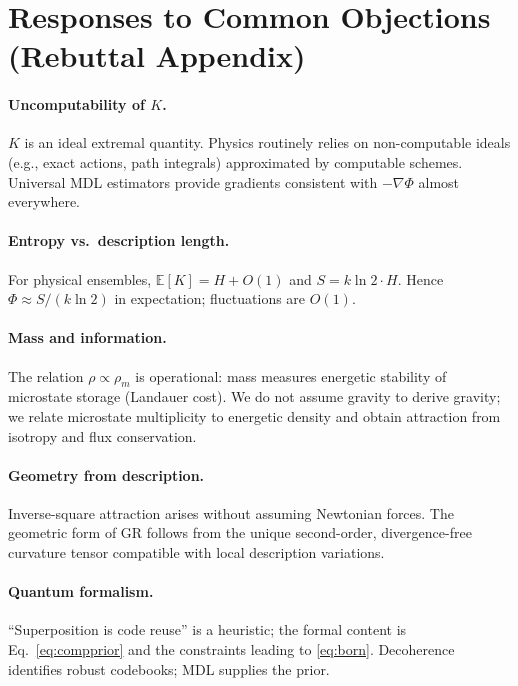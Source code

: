 \documentclass[aps,preprint,onecolumn,longbibliography,nofootinbib]{revtex4-2}
\numberwithin{equation}{section}        %
\begin{document}
\section{Responses to Common Objections (Rebuttal Appendix)}\label{app:E}
\paragraph*{Uncomputability of $K$.}
$K$ is an ideal extremal quantity. Physics routinely relies on non-computable ideals (e.g., exact actions, path integrals) approximated by computable schemes. Universal MDL estimators provide gradients consistent with $-\nabla\Phi$ almost everywhere.

\paragraph*{Entropy vs.\ description length.}
For physical ensembles, $\mathbb{E}[K]=H+O(1)$ and $S=k\ln 2\cdot H$. Hence $\Phi\approx S/(k\ln2)$ in expectation; fluctuations are $O(1)$.

\paragraph*{Mass and information.}
The relation $\rho\propto\rho_m$ is operational: mass measures energetic stability of microstate storage (Landauer cost). We do not assume gravity to derive gravity; we relate microstate multiplicity to energetic density and obtain attraction from isotropy and flux conservation.

\paragraph*{Geometry from description.}
Inverse-square attraction arises without assuming Newtonian forces. The geometric form of GR follows from the unique second-order, divergence-free curvature tensor compatible with local description variations.

\paragraph*{Quantum formalism.}
“Superposition is code reuse” is a heuristic; the formal content is Eq.~\eqref{eq:compprior} and the constraints leading to \eqref{eq:born}. Decoherence identifies robust codebooks; MDL supplies the prior.

\end{document}
